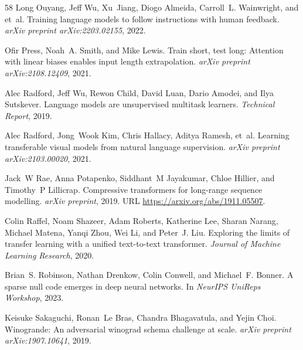 \documentclass[10pt]{article}
\theoremstyle{definition}
\theoremstyle{plain}
\begin{document}
\begin{thebibliography}{58}
Long Ouyang, Jeff Wu, Xu~Jiang, Diogo Almeida, Carroll~L. Wainwright, and et~al.
\newblock Training language models to follow instructions with human feedback.
\newblock \emph{arXiv preprint arXiv:2203.02155}, 2022.

Ofir Press, Noah~A. Smith, and Mike Lewis.
\newblock Train short, test long: Attention with linear biases enables input length extrapolation.
\newblock \emph{arXiv preprint arXiv:2108.12409}, 2021.

Alec Radford, Jeff Wu, Rewon Child, David Luan, Dario Amodei, and Ilya Sutskever.
\newblock Language models are unsupervised multitask learners.
\newblock \emph{Technical Report}, 2019.

Alec Radford, Jong~Wook Kim, Chris Hallacy, Aditya Ramesh, et~al.
\newblock Learning transferable visual models from natural language supervision.
\newblock \emph{arXiv preprint arXiv:2103.00020}, 2021.

Jack~W Rae, Anna Potapenko, Siddhant~M Jayakumar, Chloe Hillier, and Timothy~P Lillicrap.
\newblock Compressive transformers for long-range sequence modelling.
\newblock \emph{arXiv preprint}, 2019.
\newblock URL \url{https://arxiv.org/abs/1911.05507}.

Colin Raffel, Noam Shazeer, Adam Roberts, Katherine Lee, Sharan Narang, Michael Matena, Yanqi Zhou, Wei Li, and Peter~J. Liu.
\newblock Exploring the limits of transfer learning with a unified text-to-text transformer.
\newblock \emph{Journal of Machine Learning Research}, 2020.

Brian~S. Robinson, Nathan Drenkow, Colin Conwell, and Michael~F. Bonner.
\newblock A sparse null code emerges in deep neural networks.
\newblock In \emph{NeurIPS UniReps Workshop}, 2023.

Keisuke Sakaguchi, Ronan~Le Bras, Chandra Bhagavatula, and Yejin Choi.
\newblock Winogrande: An adversarial winograd schema challenge at scale.
\newblock \emph{arXiv preprint arXiv:1907.10641}, 2019.


\end{thebibliography}
\end{document}
